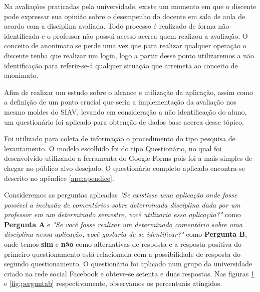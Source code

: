 \documentclass[12pt, a4paper]{report}
\begin{document}
Na avaliações praticadas pela universidade, existe um momento em que o discente pode expressar sua opinião sobre o desempenho do docente em sala de aula de acordo com a disciplina avaliada. Todo processo é realizado de forma não identificada e o professor não possui acesso acerca quem realizou a avaliação. O conceito de anonimato se perde uma vez que para realizar qualquer operação o discente tenha que realizar um login, logo a partir desse ponto utilizaremos a não identificação para referir-se-á qualquer situação que arremeta ao conceito de anonimato.

Afim de realizar um estudo sobre o alcance e utilização da aplicação, assim como a definição de um ponto crucial que seria a implementação da avaliação nos mesmo moldes do SIAV, levando em consideração a não identificação do aluno, um questionário foi aplicado para obtenção de dados base acerca desse tópico. %

Foi utilizado para coleta de informação o procedimento do tipo pesquisa de levantamento. O modelo escolhido foi do tipo Questionário, no qual foi desenvolvido utilizando a ferramenta do Google Forms pois foi a mais simples de chegar no público alvo desejado. O questionário completo aplicado encontra-se descrito no apêndice \ref{ape:apendice}.

Consideremos as perguntas aplicadas \textit{"Se existisse uma aplicação onde fosse possível a inclusão de comentários sobre determinada disciplina dada por um professor em um determinado semestre, você utilizaria essa aplicação?"} como \textbf{Pergunta A} e \textit{ 
"Se você fosse realizar um determinado comentário sobre uma disciplina nessa aplicação, você gostaria de se identificar?"} como \textbf{Pergunta B}, onde temos \textbf{sim} e \textbf{não} como alternativas de resposta e a resposta positiva do primeiro questionamento está relacionada com a possibilidade de resposta do segundo questionamento. O questionário foi aplicado num grupo da universidade criado na rede social Facebook e obteve-se setenta e duas respostas. Nas figuras \ref{fig:perguntaa} e \ref{fig:perguntab} respectivamente, observamos os percentuais atingidos.
%
\results
{}
\begin{figure}
\centering
{}
\caption{}
\label{fig:perguntaa}
\end{figure}
\end{document}
